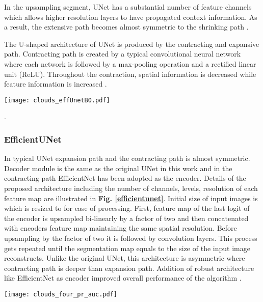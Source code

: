\documentclass[conference]{IEEEtran}
\begin{document}
In the upsampling segment, UNet has a substantial number of feature channels which allows higher resolution layers to have propagated context information. As a result, the extensive path becomes almost symmetric to the shrinking path \cite{long2015fully}. 

The U-shaped architecture of UNet is produced by the contracting and expansive path. Contracting path is created by a typical convolutional neural network where each network is followed by a max-pooling operation and a rectified linear unit (ReLU). Throughout the contraction, spatial information is decreased while feature information is increased \cite{ronneberger2015u}.

\begin{figure*}[ht!]
 \center
  \texttt{[image: clouds\_effUnetB0.pdf]}
  \caption{Architecture of EfficientUNet with EfficientNet-B0 framework for semantic segmentation. Blocks of EfficientNet-B0 as encoder has been presented in figure \ref{mbconv}}.
  \label{efficientunet}
\end{figure*}


\subsubsection{EfficientUNet}\label{effunet}
In typical UNet expansion path and the contracting path is almost symmetric. Decoder module is the same as the original UNet in this work and in the contracting path EfficientNet has been adopted as the encoder. Details of the proposed architecture including the number of channels, levels, resolution of each feature map are illustrated in \textbf{Fig. \ref{efficientunet}}. Initial size of input images is  which is resized to  for ease of processing. First, feature map of the last logit of the encoder is upsampled bi-linearly by a factor of two and then concatenated with encoders feature map maintaining the same spatial resolution. Before upsampling by the factor of two it is followed by  convolution layers. This process gets repeated until the segmentation map equals to the size of the input image reconstructs. Unlike the original UNet, this architecture is asymmetric where contracting path is deeper than expansion path. Addition of robust architecture like EfficientNet as encoder improved overall performance of the algorithm \cite{baheti2020eff}.

\begin{figure*}
 \center
  \texttt{[image: clouds\_four\_pr\_auc.pdf]}
  \caption{PR-Curves for All Four Classes}
  \label{AAA}
\end{figure*}
\end{document}

